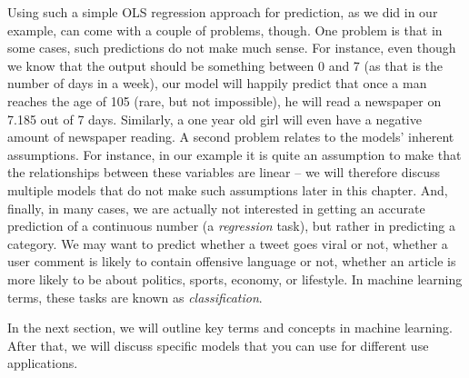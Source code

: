 Using such a simple OLS regression approach for prediction, as we did in our example, can come with a couple of problems, though. One problem is that in some cases, such predictions do not make much sense. For instance, even though we know that the output should be something between 0 and 7 (as that is the number of days in a week), our model will happily predict that once a man reaches the age of 105 (rare, but not impossible), he will read a newspaper on 7.185 out of 7 days. Similarly, a one year old girl will even have a negative amount of newspaper reading. A second problem relates to the models' inherent assumptions. For instance, in our example it is quite an assumption to make that the relationships between these variables are linear – we will therefore discuss multiple models that do not make such assumptions later in this chapter. And, finally, in many cases, we are actually not interested in getting an accurate prediction of a continuous number (a \textit{regression} task), but rather in predicting a category. We may want to predict whether a tweet goes viral or not, whether a user comment is likely to contain offensive language or not, whether an article is more likely to be about politics, sports, economy, or lifestyle. In machine learning terms, these tasks are known as \textit{classification}.

In the next section, we will outline key terms and concepts in machine
learning. After that, we will discuss specific models that you
can use for different use applications.
